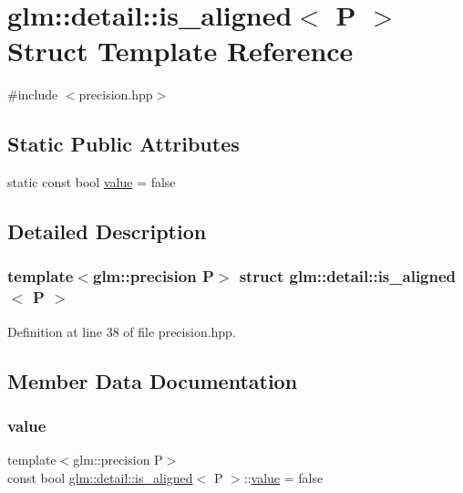 \hypertarget{structglm_1_1detail_1_1is__aligned}{}\section{glm\+::detail\+::is\+\_\+aligned$<$ P $>$ Struct Template Reference}
\label{structglm_1_1detail_1_1is__aligned}


{\ttfamily \#include $<$precision.\+hpp$>$}

\subsection*{Static Public Attributes}
\begin{DoxyCompactItemize}
\item 
static const bool \mbox{\hyperlink{structglm_1_1detail_1_1is__aligned_ac46592cb8bac0221314181e0143aa265}{value}} = false
\end{DoxyCompactItemize}


\subsection{Detailed Description}
\subsubsection*{template$<$glm\+::precision P$>$\newline
struct glm\+::detail\+::is\+\_\+aligned$<$ P $>$}



Definition at line 38 of file precision.\+hpp.



\subsection{Member Data Documentation}
\mbox{\label{structglm_1_1detail_1_1is__aligned_ac46592cb8bac0221314181e0143aa265}} 
\subsubsection{\texorpdfstring{value}{value}}
{\footnotesize\ttfamily template$<$glm\+::precision P$>$ \\
const bool \mbox{\hyperlink{structglm_1_1detail_1_1is__aligned}{glm\+::detail\+::is\+\_\+aligned}}$<$ P $>$\+::\mbox{\hyperlink{glad_8h_a03aff08f73d7fde3d1a08e0abd8e84fa}{value}} = false\hspace{0.3cm}{\ttfamily [static]}}



